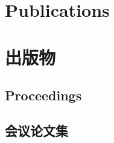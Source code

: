  {
    \section{\textbf{Publications}}
}{
    \section{\textbf{出版物}}
}

 {
  \subsection{Proceedings}
}{
  \subsection{会议论文集}
}

